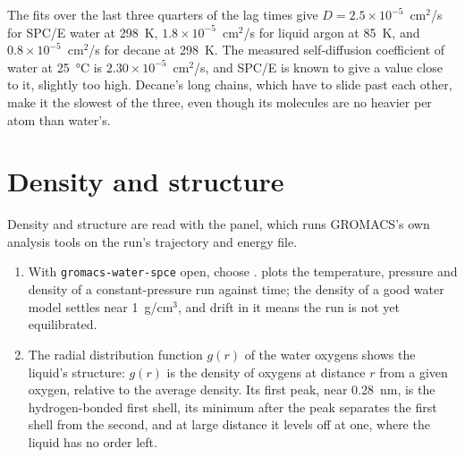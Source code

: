 The fits over the last three quarters of the lag times give $D = 2.5 \times 10^{-5}$~cm$^2$/s for SPC/E water at 298~K, $1.8 \times 10^{-5}$~cm$^2$/s for liquid argon at 85~K, and $0.8 \times 10^{-5}$~cm$^2$/s for decane at 298~K. The measured self-diffusion coefficient of water at 25~°C is $2.30 \times 10^{-5}$~cm$^2$/s, and SPC/E is known to give a value close to it, slightly too high. Decane's long chains, which have to slide past each other, make it the slowest of the three, even though its molecules are no heavier per atom than water's.

\section{Density and structure}
Density and structure are read with the  panel, which runs GROMACS's own analysis tools on the run's trajectory and energy file.
\begin{enumerate}
	\item With \texttt{gromacs-water-spce} open, choose .  plots the temperature, pressure and density of a constant-pressure run against time; the density of a good water model settles near 1~g/cm$^3$, and drift in it means the run is not yet equilibrated.
	\item The radial distribution function $g(r)$ of the water oxygens shows the liquid's structure: $g(r)$ is the density of oxygens at distance $r$ from a given oxygen, relative to the average density. Its first peak, near 0.28~nm, is the hydrogen-bonded first shell, its minimum after the peak separates the first shell from the second, and at large distance it levels off at one, where the liquid has no order left.
\end{enumerate}

